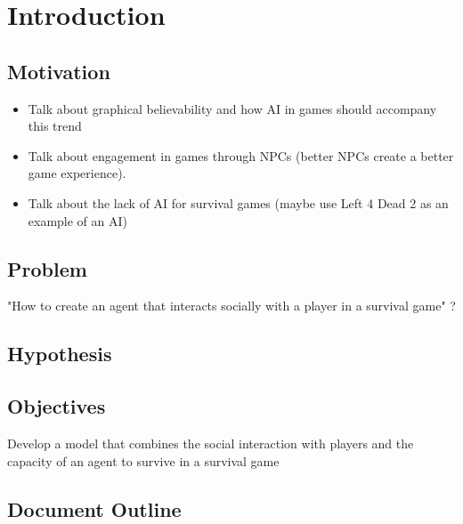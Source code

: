 \section{Introduction}

\subsection{Motivation}

\begin{itemize}
	\item Talk about graphical believability and how AI in games should accompany this trend
	\item Talk about engagement in games through NPCs (better NPCs create a better game experience).
	\item Talk about the lack of AI for survival games (maybe use Left 4 Dead 2 as an example of an AI)
\end{itemize}

\subsection{Problem}
"How to create an agent that interacts socially with a player in a survival game" ?

\subsection{Hypothesis}


\subsection{Objectives}
Develop a model that combines the social interaction with players and the capacity of an agent to survive in a survival game

\subsection{Document Outline}